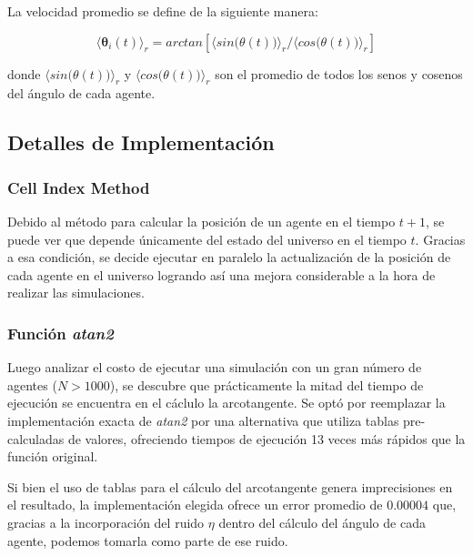 \documentclass[a4paper]{article}
\begin{document}
            La velocidad promedio se define de la siguiente manera:

            \begin{equation}
            \langle\mathbf{\theta}_i(t)\rangle_r = arctan[\langle sin\Big(\theta(t)\Big)\rangle_r / \langle cos\Big(\theta(t)\Big)\rangle_r]
            \end{equation}

            donde $\langle sin\Big(\theta(t)\Big)\rangle_r$ y $\langle cos\Big(\theta(t)\Big)\rangle_r$ son el promedio de todos los senos y cosenos del ángulo de cada agente.

        \subsection{Detalles de Implementación}

            \subsubsection{Cell Index Method}

                Debido al método para calcular la posición de un agente en el tiempo $t + 1$, se puede ver que depende únicamente del estado del universo en el tiempo $t$. Gracias a esa condición, se decide ejecutar en paralelo la actualización de la posición de cada agente en el universo logrando así una mejora considerable a la hora de realizar las simulaciones.

            \subsubsection{Función \textit{atan2}}

                Luego analizar el costo de ejecutar una simulación con un gran número de agentes ($N > 1000$), se descubre que prácticamente la mitad del tiempo de ejecución se encuentra en el cáclulo la arcotangente. Se optó por reemplazar la implementación exacta de \textit{atan2} por una alternativa \cite{FastAcos} que utiliza tablas pre-calculadas de valores, ofreciendo tiempos de ejecución 13 veces más rápidos que la función original.

                Si bien el uso de tablas para el cálculo del arcotangente genera imprecisiones en el resultado, la implementación elegida ofrece un error promedio de $0.00004$ que, gracias a la incorporación del ruido $\eta$ dentro del cálculo del ángulo de cada agente, podemos tomarla como parte de ese ruido.
\end{document}
